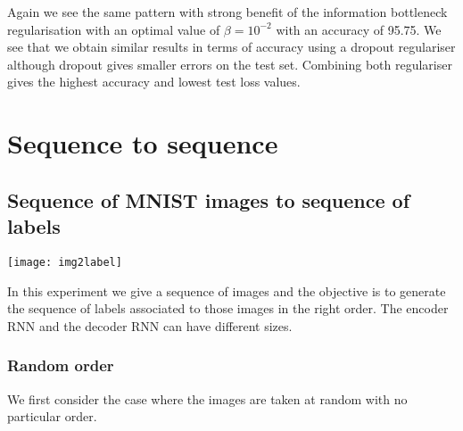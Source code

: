 \documentclass[11pt,oneside,openright]{report}
\begin{document}
\begin{center}
\end{center}

Again we see the same pattern with strong benefit of the information bottleneck regularisation with an optimal value of $\beta = 10^{-2}$ with an accuracy of 95.75. We see that we obtain similar results in terms of accuracy using a dropout regulariser although dropout gives smaller errors on the test set. Combining both regulariser gives the highest accuracy and lowest test loss values.

\section{Sequence to sequence}
\subsection{Sequence of MNIST images to sequence of labels}

\begin{center}
\texttt{[image: img2label]}
\end{center}

In this experiment we give a sequence of images and the objective is to generate the sequence of labels associated to those images in the right order. The encoder RNN and the decoder RNN can have different sizes.

\subsubsection{Random order}
We first consider the case where the images are taken at random with no particular order.
\end{document}
